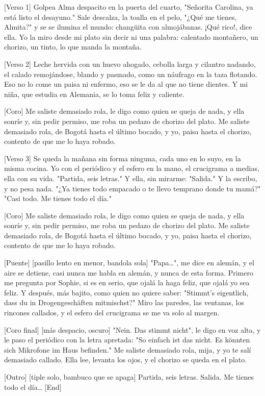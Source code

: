\begin{lyrics}

[Verso 1]
Golpea Alma despacito en la puerta del cuarto,
"Señorita Carolina, ya está listo el desayuno."
Sale descalza, la toalla en el pelo,
"¿Qué me tienes, Almita?" y se se ilumina el mundo:
changüita con almojábanas. ¡Qué rico!, dice ella.
Yo la miro desde mi plato sin decir ni una palabra:
calentado montañero, un chorizo, un tinto,
lo que manda la montaña.

[Verso 2]
Leche hervida con un huevo ahogado,
cebolla larga y cilantro nadando,
el calado remojándose, blando y pasmado,
como un náufrago en la taza flotando.
Eso no lo come un paisa ni enfermo,
eso se le da al que no tiene dientes.
Y mi niña, que estudia en Alemania,
se lo toma feliz y caliente.

[Coro]
Me saliste demasiado rola,
le digo como quien se queja de nada,
y ella sonríe y, sin pedir permiso,
me roba un pedazo de chorizo del plato.
Me saliste demasiado rola,
de Bogotá hasta el último bocado,
y yo, paisa hasta el chorizo,
contento de que me lo haya robado.

[Verso 3]
Se queda la mañana sin forma ninguna,
cada uno en lo suyo, en la misma cocina.
Yo con el periódico y el esfero en la mano,
el crucigrama a medias, ella con su vida.
"Partida, seis letras." Y ella, sin mirarme:
"Salida." Y la escribo, y no pesa nada.
"¿Ya tienes todo empacado o te llevo temprano
donde tu mamá?" "Casi todo. Me tienes todo el día."

[Coro]
Me saliste demasiado rola,
le digo como quien se queja de nada,
y ella sonríe y, sin pedir permiso,
me roba un pedazo de chorizo del plato.
Me saliste demasiado rola,
de Bogotá hasta el último bocado,
y yo, paisa hasta el chorizo,
contento de que me lo haya robado.

[Puente]
[pasillo lento en menor, bandola sola]
"Papa…", me dice en alemán, y el aire se detiene,
casi nunca me habla en alemán, y nunca de esta forma.
Primero me pregunta por Sophie, si es en serio,
que ojalá la haga feliz, que ojalá yo sea feliz.
Y después, más bajito, como quien no quiere saber:
"Stimmt's eigentlich, dass du in Drogengeschäften mitmischst?"
Miro las paredes, las ventanas, los rincones callados,
y el esfero del crucigrama se me va solo al margen.

[Coro final]
[más despacio, oscuro]
"Nein. Das stimmt nicht", le digo en voz alta,
y le paso el periódico con la letra apretada:
"So einfach ist das nicht.
Es könnten sich Mikrofone im Haus befinden."
Me saliste demasiado rola, mija,
y yo te salí demasiado callado.
Ella lee, levanta los ojos,
y el chorizo se queda en el plato.

[Outro]
[tiple solo, bambuco que se apaga]
Partida, seis letras.
Salida.
Me tienes todo el día…
[End]
\end{lyrics}

